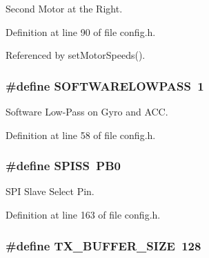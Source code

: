 Second Motor at the Right. 



Definition at line 90 of file config.\-h.



Referenced by set\-Motor\-Speeds().

\hypertarget{group__config_gaba06e7be57726e74f267a1622e7d720e}{
\subsubsection[{S\-O\-F\-T\-W\-A\-R\-E\-L\-O\-W\-P\-A\-S\-S}]{\setlength{\rightskip}{0pt plus 5cm}\#define S\-O\-F\-T\-W\-A\-R\-E\-L\-O\-W\-P\-A\-S\-S~1}}\label{group__config_gaba06e7be57726e74f267a1622e7d720e}


Software Low-\/\-Pass on Gyro and A\-C\-C. 



Definition at line 58 of file config.\-h.

\hypertarget{group__config_gab652052c0495e4b720b52cdcf83f535d}{
\subsubsection[{S\-P\-I\-S\-S}]{\setlength{\rightskip}{0pt plus 5cm}\#define S\-P\-I\-S\-S~P\-B0}}\label{group__config_gab652052c0495e4b720b52cdcf83f535d}


S\-P\-I Slave Select Pin. 



Definition at line 163 of file config.\-h.

\hypertarget{group__config_ga9ab33647617098646990fe263600b650}{
\subsubsection[{T\-X\-\_\-\-B\-U\-F\-F\-E\-R\-\_\-\-S\-I\-Z\-E}]{\setlength{\rightskip}{0pt plus 5cm}\#define T\-X\-\_\-\-B\-U\-F\-F\-E\-R\-\_\-\-S\-I\-Z\-E~128}}\label{group__config_ga9ab33647617098646990fe263600b650}


